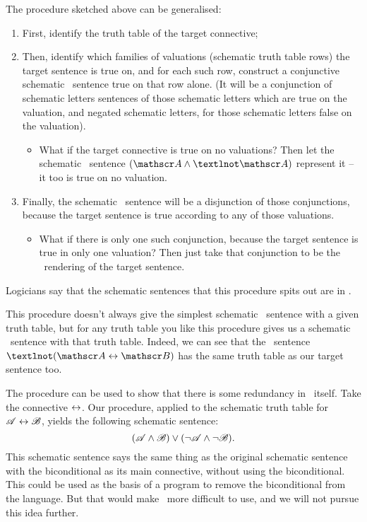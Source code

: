 The procedure sketched above can be generalised: \begin{enumerate}
	\item First, identify the truth table of the target connective;
	\item Then, identify which families of valuations (schematic truth table rows) the target sentence is true on, and for each such row, construct a conjunctive schematic \TFL\ sentence true on that row alone. (It will be a conjunction of schematic letters sentences of those schematic letters which are true on the valuation, and negated schematic letters, for those schematic letters false on the valuation). \begin{itemize}
		\item What if the target connective is true on no valuations? Then let the schematic \TFL\ sentence $(\meta{A} \wedge ¬\meta{A})$ represent it – it too is true on no valuation.
	\end{itemize}
	\item Finally, the schematic \TFL\ sentence will be a disjunction of those conjunctions, because the target sentence is true according to any of those valuations. \begin{itemize}
		\item What if there is only one such conjunction, because the target sentence is true in only one valuation? Then just take that conjunction to be the \TFL\ rendering of the target sentence.
	\end{itemize}
\end{enumerate}  
Logicians say that the schematic sentences that this procedure spits out are in .


This procedure doesn't always give the simplest schematic \TFL\ sentence with a given truth table, but for any truth table you like this procedure gives us a schematic \TFL\ sentence with that truth table. Indeed, we can see that the \TFL\ sentence $¬(\meta{A} \eiff \meta{B})$ has the same truth table as our target sentence too.

The procedure can be used to show that there is some redundancy in \TFL\ itself. Take the connective $\leftrightarrow$. Our procedure, applied to the schematic truth table for $\mathscr{A}\leftrightarrow\mathscr{B}$, yields the following schematic sentence: \[(\mathscr{A}\wedge\mathscr{B})\vee(\neg\mathscr{A}\wedge\neg\mathscr{B}).\] This schematic sentence says the same thing as the original schematic sentence with the biconditional as its main connective, without using the biconditional. This could be used as the basis of a program to remove the biconditional from the language. But that would make \TFL\ more difficult to use, and we will not pursue this idea further.

